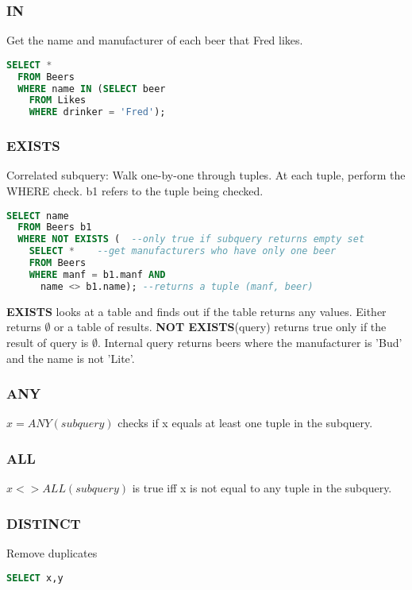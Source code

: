 \documentclass[12pt]{article}
\begin{document}
\subsubsection{IN}
Get the name and manufacturer of each beer that Fred likes.
\begin{lstlisting}[language=SQL]
  SELECT *
  FROM Beers
  WHERE name IN (SELECT beer
    FROM Likes
    WHERE drinker = 'Fred');
\end{lstlisting}

\subsubsection{EXISTS}

Correlated subquery: 
Walk one-by-one through tuples.
At each tuple, perform the WHERE check.
b1 refers to the tuple being checked.
\begin{lstlisting}[language=SQL]
  SELECT name
  FROM Beers b1
  WHERE NOT EXISTS (  --only true if subquery returns empty set
    SELECT *    --get manufacturers who have only one beer
    FROM Beers
    WHERE manf = b1.manf AND
      name <> b1.name); --returns a tuple (manf, beer)
\end{lstlisting}

\textbf{EXISTS} looks at a table and finds out if the table returns any values.
Either returns $\emptyset$ or a table of results. \textbf{NOT EXISTS}(query)
returns true only if the result of query is $\emptyset$.
Internal query returns beers where the manufacturer is 'Bud' and the name is not
'Lite'.

\subsubsection{ANY}
$x = ANY (subquery)$ checks if  x equals at least one tuple in the subquery.
\subsubsection{ALL}
$x <> ALL(subquery)$ is true iff x is not equal to any tuple in the subquery.

\subsubsection{DISTINCT}
Remove duplicates

\begin{lstlisting}[language=SQL]
  SELECT x,y
\end{lstlisting}
\end{document}
